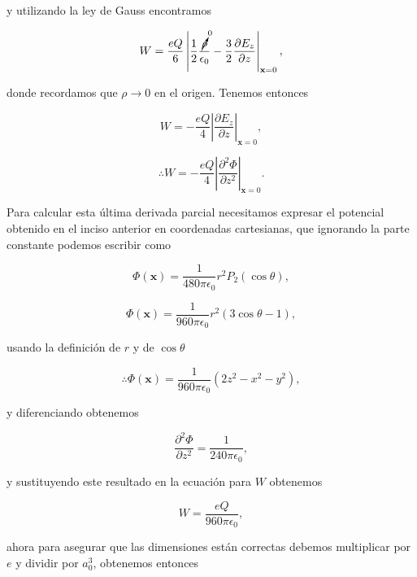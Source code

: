 \documentclass[a4paper,11pt]{article}
\numberwithin{equation}{section}
\begin{document}
y utilizando la ley de Gauss encontramos 

\begin{equation}
  W = \frac{eQ}{6}\left|\frac{1}{2}\frac{\cancelto{0}{\rho}}{\epsilon_0}
 - \frac{3}{2}\frac{\partial E_z}{\partial z}\right|_{\mathbf{x}=0},
\end{equation}

donde recordamos que $\rho \rightarrow 0$ en el origen. Tenemos entonces 

\begin{equation}
 W = - \frac{eQ}{4}\left|\frac{\partial E_z}{\partial z} \right|_{\mathbf{x}=0},
\end{equation}

\begin{equation}
 \therefore W = -\frac{eQ}{4}\left|\frac{\partial^2 \Phi}{\partial z^2} \right|_{\mathbf{x}=0}.
\end{equation}

Para calcular esta última derivada parcial necesitamos expresar el potencial obtenido 
en el inciso anterior en coordenadas cartesianas, que ignorando la parte constante 
podemos escribir como 

\begin{equation}
 \Phi(\mathbf{x}) = \frac{1}{480\pi\epsilon_0}r^2P_2(\cos{\theta}),
\end{equation}

\begin{equation}
  \Phi(\mathbf{x}) = \frac{1}{960\pi\epsilon_0}r^2(3\cos{\theta} - 1),
\end{equation}

usando la definición de $r$ y de $\cos{\theta}$

\begin{equation}
  \therefore \Phi(\mathbf{x}) = \frac{1}{960\pi\epsilon_0}(2z^2 - x^2 - y^2),
\end{equation}

y diferenciando obtenemos 

\begin{equation}
 \frac{\partial^2 \Phi}{\partial z^2} = \frac{1}{240\pi\epsilon_0},
\end{equation}

y sustituyendo este resultado en la ecuación para $W$ obtenemos 

\begin{equation}
 W = \frac{eQ}{960\pi\epsilon_0},
\end{equation}

ahora para asegurar que las dimensiones están correctas debemos multiplicar por 
$e$ y dividir por $a_0^3$, obtenemos entonces 
\end{document}
